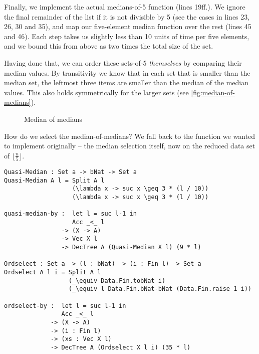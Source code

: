 Finally, we implement the actual medians-of-5 function (lines 19ff.). We ignore the final remainder of the list if it is not divisible by 5 (see the cases in lines 23, 26, 30 and 35), and map our five-element median function over the rest (lines 45 and 46). Each step takes us slightly less than 10 units of time per five elements, and we bound this from above as two times the total size of the set.

Having done that, we can order these sets-of-5 \emph{themselves} by comparing their median values. By transitivity we know that in each set that is smaller than the median set, the leftmost three items are smaller than the median of the median values. This also holds symmetrically for the larger sets (see \autoref{fig:median-of-medians}).

\begin{figure}
\begin{center}
    
\end{center}
\caption{Median of medians}
\label{fig:median-of-medians}
\end{figure}

How do we select the median-of-medians? We fall back to the function we wanted to implement originally -- the median selection itself, now on the reduced data set of $\lfloor \frac n 5 \rfloor$.

\noindent\begin{minipage}{\linewidth}
\begin{lstlisting}[caption={Quasi-median and order statistic signatures},label={lst:median:quasimedian},emph={Quasi,Median,quasi,median,by,ordselect,Ordselect}]
Quasi-Median : Set a -> bNat -> Set a
Quasi-Median A l = Split A l
                   (\lambda x -> suc x \geq 3 * (l / 10))
                   (\lambda x -> suc x \geq 3 * (l / 10))

quasi-median-by :  let l = suc l-1 in
                   Acc _<_ l
                -> (X -> A)
                -> Vec X l
                -> DecTree A (Quasi-Median X l) (9 * l)

Ordselect : Set a -> (l : bNat) -> (i : Fin l) -> Set a
Ordselect A l i = Split A l
                  (_\equiv Data.Fin.tobNat i)
                  (_\equiv l Data.Fin.bNat-bNat (Data.Fin.raise 1 i))

ordselect-by :  let l = suc l-1 in
                Acc _<_ l
             -> (X -> A)
             -> (i : Fin l)
             -> (xs : Vec X l)
             -> DecTree A (Ordselect X l i) (35 * l)
\end{lstlisting}
\end{minipage}

